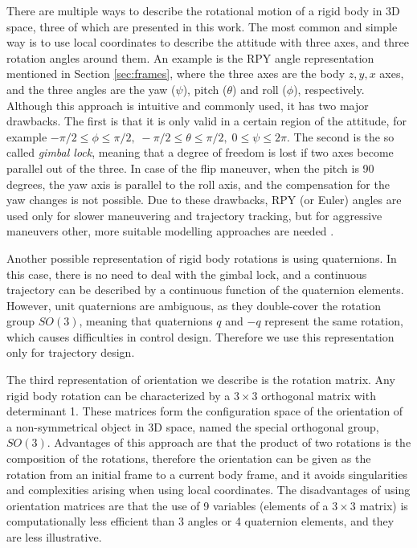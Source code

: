 There are multiple ways to describe the rotational motion of a rigid body in 3D space, three of which are presented in this work. The most common and simple way is to use local coordinates to describe the attitude with three axes, and three rotation angles around them. An example is the RPY angle representation mentioned in Section \ref{sec:frames}, where the three axes are the body $z, y, x$ axes, and the three angles are the yaw ($\psi$), pitch ($\theta$) and roll ($\phi$), respectively. Although this approach is intuitive and commonly used, it has two major drawbacks. The first is that it is only valid in a certain region of the attitude, for example $-\pi/2 \leq \phi \leq \pi/2,\; -\pi/2 \leq \theta \leq \pi/2,\; 0 \leq \psi \leq 2\pi$. The second is the so called \textit{gimbal lock}, meaning that a degree of freedom is lost if two axes become parallel out of the three. In case of the flip maneuver, when the pitch is 90 degrees, the yaw axis is parallel to the roll axis, and the compensation for the yaw changes is not possible. Due to these drawbacks, RPY (or Euler) angles are used only for slower maneuvering and trajectory tracking, but for aggressive maneuvers other,  more suitable modelling approaches are needed .

Another possible representation of rigid body rotations is using quaternions. In this case, there is no need to deal with the gimbal lock, and a continuous trajectory can be described by a continuous function of the quaternion elements. However, unit quaternions are ambiguous, as they double-cover the rotation group $SO(3)$, meaning that quaternions $q$ and $-q$ represent the same rotation, which causes difficulties in control design. Therefore we use this representation only for trajectory design.

The third representation of orientation we describe is the rotation matrix. Any rigid body rotation can be characterized by a $3\times 3$ orthogonal matrix with determinant 1. These matrices form the configuration space of the orientation of a non-symmetrical object in 3D space, named the special orthogonal group, $SO(3)$. Advantages of this approach are that the product of two rotations is the composition of the rotations, therefore the orientation can be given as the rotation from an initial frame to a current body frame, and it avoids singularities and complexities arising when using local coordinates. The disadvantages of using orientation matrices are that the use of 9 variables (elements of a $3\times 3$ matrix) is computationally less efficient than 3 angles or 4 quaternion elements, and they are less illustrative.

